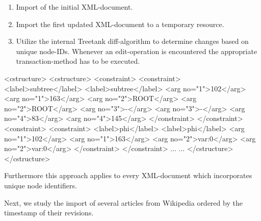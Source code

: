 \begin{enumerate}
\item Import of the initial XML-document.
\item Import the first updated XML-document to a temporary resource.
\item Utilize the internal Treetank diff-algorithm to determine changes based on unique node-IDs. Whenever an edit-operation is encountered the appropriate transaction-method has to be executed. %
\end{enumerate}


\begin{code}[caption={CStructure comparison.},label={lst:linguistscomparison}]
<cstructure>                   <cstructure>
  <constraint>                   <constraint>
    <label>subtree</label>         <label>subtree</label>
    <arg no="1">102</arg>          <arg no="1">163</arg>
    <arg no="2">ROOT</arg>         <arg no="2">ROOT</arg>   
    <arg no="3">-</arg>            <arg no="3">-</arg>
    <arg no="4">83</arg>           <arg no="4">145</arg>
  </constraint>                  </constraint>
  <constraint>                   <constraint>
    <label>phi</label>             <label>phi</label>
    <arg no="1">102</arg>          <arg no="1">163</arg>
    <arg no="2">var:0</arg>        <arg no="2">var:0</arg>
  </constraint>                  </constraint>
  ...                            ...
</cstructure>                  </cstructure>
\end{code}

Furthermore this approach applies to every XML-document which incorporates unique node identifiers.

Next, we study the import of several articles from Wikipedia ordered by the timestamp of their revisions. 

